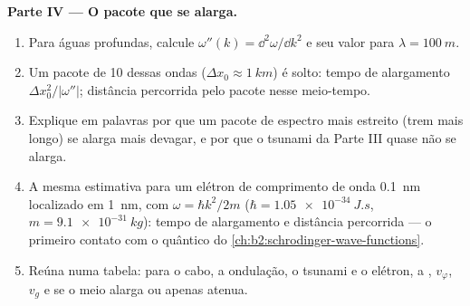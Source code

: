 \begin{problem}
\medskip
\noindent\textbf{Parte IV --- O pacote que se alarga.}
\begin{enumerate}[resume]
  \item Para águas profundas, calcule $\omega''(k) = \dd^2\omega/\dd k^2$ e seu valor
        para $\lambda = \qty{100}{m}$.
  \item Um pacote de \qty{10}{} dessas ondas ($\Delta x_0 \approx \qty{1}{km}$) é
        solto: tempo de alargamento $\Delta x_0^2/|\omega''|$; distância percorrida
        pelo pacote nesse meio-tempo.
  \item Explique em palavras por que um pacote de espectro mais estreito
        (trem mais longo) se alarga mais devagar, e por que o tsunami da
        Parte III quase não se alarga.
  \item A mesma estimativa para um elétron de comprimento de onda \qty{0.1}{nm}
        localizado em \qty{1}{nm}, com $\omega = \hbar k^2/2m$ ($\hbar =
        \qty{1.05e-34}{J.s}$, $m = \qty{9.1e-31}{kg}$): tempo de alargamento e
        distância percorrida --- o primeiro contato com o 
        quântico do \cref{ch:b2:schrodinger-wave-functions}.
  \item Reúna numa tabela: para o cabo, a ondulação, o tsunami e
        o elétron, a , $v_\varphi$, $v_g$ e
        se o meio alarga ou apenas atenua.
\end{enumerate}
\end{problem}
